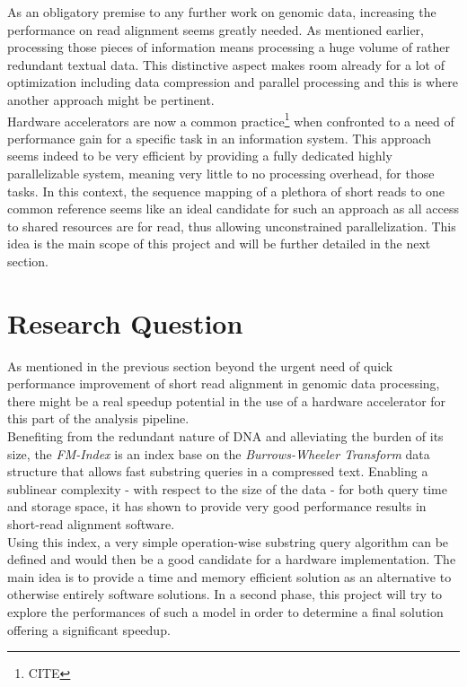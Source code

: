 As an obligatory premise to any further work on genomic data, increasing the performance on read alignment seems greatly needed. As mentioned earlier, processing those pieces of information means processing a huge volume of rather redundant textual data. This distinctive aspect makes room already for a lot of optimization including data compression and parallel processing and this is where another approach might be pertinent. \\

Hardware accelerators are now a common practice\footnote{CITE} when confronted to a need of performance gain for a specific task in an information system. This approach seems indeed to be very efficient by providing a fully dedicated highly parallelizable system, meaning very little to no processing overhead, for those tasks. In this context, the sequence mapping of a plethora of short reads to one common reference seems like an ideal candidate for such an approach as all access to shared resources are for read, thus allowing unconstrained parallelization. This idea is the main scope of this project and will be further detailed in the next section.

\section{Research Question}

As mentioned in the previous section beyond the urgent need of quick performance improvement of short read alignment in genomic data processing, there might be a real speedup potential in the use of a hardware accelerator for this part of the analysis pipeline. \\

Benefiting from the redundant nature of DNA and alleviating the burden of its size, the \textsl{FM-Index} is an index base on the \textsl{Burrows-Wheeler Transform} data structure that allows fast substring queries in a compressed text. Enabling a sublinear complexity - with respect to the size of the data - for both query time and storage space, it has shown to provide very good performance results in short-read alignment software. \\

Using this index, a very simple operation-wise substring query algorithm can be defined and would then be a good candidate for a hardware implementation. The main idea is to provide a time and memory efficient solution as an alternative to otherwise entirely software solutions. In a second phase, this project will try to explore the performances of such a model in order to determine a final solution offering a significant speedup.


